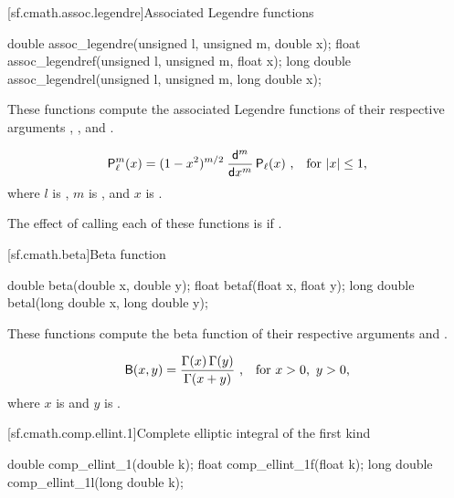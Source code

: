 [sf.cmath.assoc.legendre]{Associated Legendre functions}%
%
%
%
%
%
\begin{itemdecl}
double       assoc_legendre(unsigned l, unsigned m, double x);
float        assoc_legendref(unsigned l, unsigned m, float x);
long double  assoc_legendrel(unsigned l, unsigned m, long double x);
\end{itemdecl}

\begin{itemdescr}

\pnum\effects
These functions compute
the associated Legendre functions
of their respective arguments
, , and .

\pnum
\returns
\[ \mathsf{P}_\ell^m(x) = (1 - x^2) ^ {m/2} \:
   \frac{\mathsf{d} ^ m}{\mathsf{d}x ^ m} \, \mathsf{P}_\ell(x)
   \text{ ,\quad for $|x| \le 1$,} \]
where
$l$ is ,
$m$ is , and
$x$ is .

\pnum
\remarks
The effect of calling each of these functions
is 
if .
\end{itemdescr}

[sf.cmath.beta]{Beta function}%
%
%
%
%
%
\begin{itemdecl}
double       beta(double x, double y);
float        betaf(float x, float y);
long double  betal(long double x, long double y);
\end{itemdecl}

\begin{itemdescr}
\pnum
\effects
These functions compute
the beta function
of their respective arguments
 and .

\pnum
\returns
\[ \mathsf{B}(x, y) = \frac{\Gamma(x) \, \Gamma(y)}{\Gamma(x + y)}
   \text{ ,\quad for $x > 0$,\, $y > 0$,} \]
where
$x$ is  and
$y$ is .
\end{itemdescr}

[sf.cmath.comp.ellint.1]{Complete elliptic integral of the first kind}%
%
%
%
%
%
\begin{itemdecl}
double       comp_ellint_1(double k);
float        comp_ellint_1f(float k);
long double  comp_ellint_1l(long double k);
\end{itemdecl}

